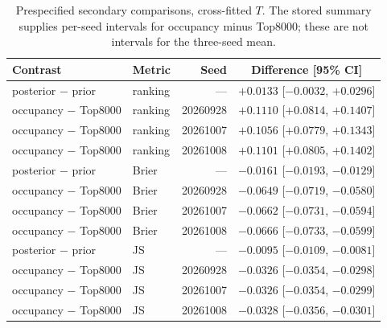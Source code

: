 \documentclass[10pt,a4paper]{article}
\begin{document}
\begin{table}[!htbp]
\centering
\caption{Prespecified secondary comparisons, cross-fitted $T$. The stored summary supplies per-seed intervals for occupancy minus Top8000; these are not intervals for the three-seed mean.}
\label{tab:afsecondarycal}
\small\setlength{\tabcolsep}{4pt}
\begin{tabular}{@{}llrc@{}}
\toprule
Contrast & Metric & Seed & Difference [95\% CI] \\
\midrule
posterior $-$ prior & ranking & --- & $+0.0133$ [$-0.0032$, $+0.0296$] \\
occupancy $-$ Top8000 & ranking & 20260928 & $+0.1110$ [$+0.0814$, $+0.1407$] \\
occupancy $-$ Top8000 & ranking & 20261007 & $+0.1056$ [$+0.0779$, $+0.1343$] \\
occupancy $-$ Top8000 & ranking & 20261008 & $+0.1101$ [$+0.0805$, $+0.1402$] \\
posterior $-$ prior & Brier & --- & $-0.0161$ [$-0.0193$, $-0.0129$] \\
occupancy $-$ Top8000 & Brier & 20260928 & $-0.0649$ [$-0.0719$, $-0.0580$] \\
occupancy $-$ Top8000 & Brier & 20261007 & $-0.0662$ [$-0.0731$, $-0.0594$] \\
occupancy $-$ Top8000 & Brier & 20261008 & $-0.0666$ [$-0.0733$, $-0.0599$] \\
posterior $-$ prior & JS & --- & $-0.0095$ [$-0.0109$, $-0.0081$] \\
occupancy $-$ Top8000 & JS & 20260928 & $-0.0326$ [$-0.0354$, $-0.0298$] \\
occupancy $-$ Top8000 & JS & 20261007 & $-0.0326$ [$-0.0354$, $-0.0299$] \\
occupancy $-$ Top8000 & JS & 20261008 & $-0.0328$ [$-0.0356$, $-0.0301$] \\
\bottomrule
\end{tabular}
\end{table}
\end{document}
